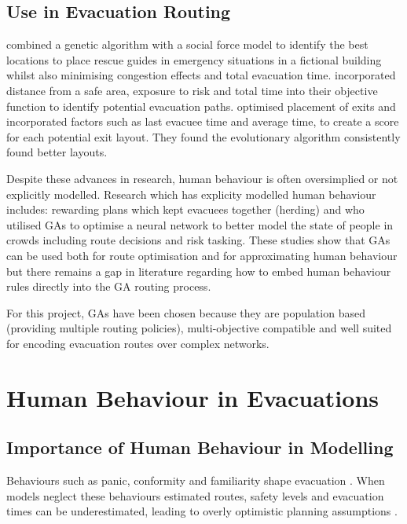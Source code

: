 \documentclass[12pt,a4paper]{report}
\begin{document}
\subsection{Use in Evacuation Routing}
\cite{VON_SCHANTZ_2022_GA} combined a genetic algorithm with a social force model to identify the best locations to place rescue guides in emergency situations in a fictional building whilst also minimising congestion effects and total evacuation time. \cite{SAADATSERESHT_2009_GA} incorporated distance from a safe area, exposure to risk and total time into their objective function to identify potential evacuation paths. \cite{COTTA_2024_GA} optimised placement of exits and incorporated factors such as last evacuee time and average time, to create a score for each potential exit layout. They found the evolutionary algorithm consistently found better layouts.

Despite these advances in research, human behaviour is often oversimplied or not explicitly modelled. Research which has explicity modelled human behaviour includes: \cite{HANSEN_2016_GA_GROUPS} rewarding plans which kept evacuees together (herding) and \cite{DEMBYTSKYI_2017_GA} who utilised GAs to optimise a neural network to better model the state of people in crowds including route decisions and risk tasking. These studies show that GAs can be used both for route optimisation and for approximating human behaviour but there remains a gap in literature regarding how to embed human behaviour rules directly into the GA routing process.

For this project, GAs have been chosen because they are population based (providing multiple routing policies), multi-objective compatible and well suited for encoding evacuation routes over complex networks.

\section{Human Behaviour in Evacuations}
\subsection{Importance of Human Behaviour in Modelling}
Behaviours such as panic, conformity and familiarity shape evacuation \citep{KULIGOWSKI_2010_BEHAVIOURS, CAUNHYE_2012_BEHAVIOUR, ZHOU_2019_BEHAVIOUR}. When models neglect these behaviours estimated routes, safety levels and evacuation times can be underestimated, leading to overly optimistic planning assumptions \citep{KEYKHAEI_2023_BEHAVIOUR, GIARDINI_2024_BEHAVIOUR}.
\end{document}
